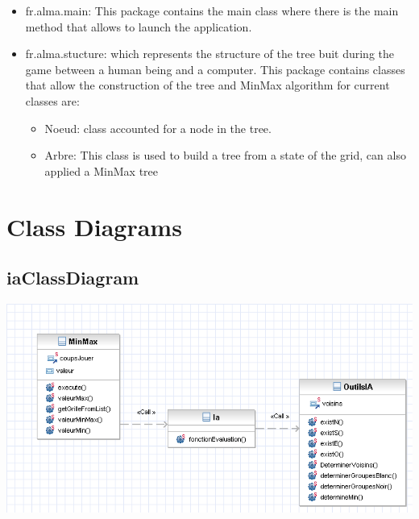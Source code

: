 \documentclass{report}
\begin{document}
\begin{itemize}
\item { {\large fr.alma.main}:  This package contains the main class where there is the main method that allows to launch the application.}\\
\item { {\large fr.alma.stucture}:  which represents the structure of the tree buit during the game between a human being and a computer.
This package contains classes that allow the construction of the tree and
MinMax algorithm for current classes are:
\begin {itemize}
     \item Noeud: class accounted for a node in the tree.
     \item Arbre: This class is used to build a tree from a state of the grid,
         can also applied a MinMax tree
\end{itemize} 
}
\end{itemize}


\section{Class Diagrams}



\subsection{iaClassDiagram}
\begin{center}
\includegraphics[scale=0.70]{images/fralmaiaClassDiagram}
\end{center}
\end{document}
